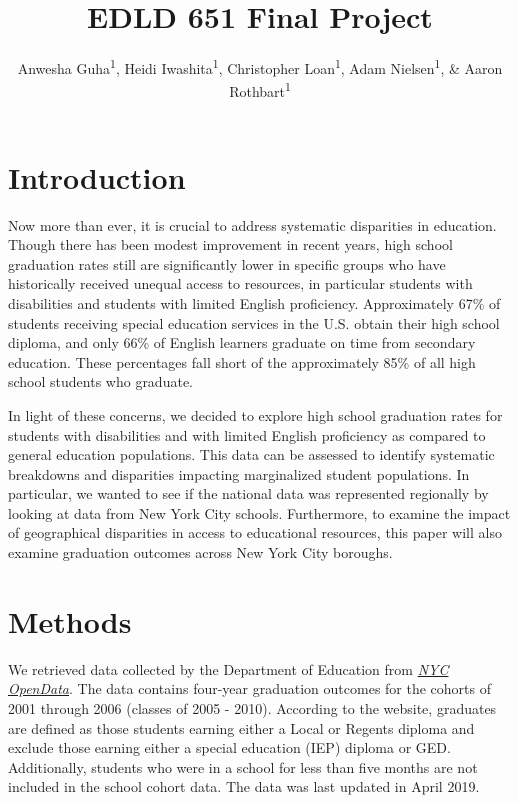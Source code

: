 \documentclass[
  english,
  man, fleqn, noextraspace]{apa6}
\title{EDLD 651 Final Project}
\author{Anwesha Guha\textsuperscript{1}, Heidi Iwashita\textsuperscript{1}, Christopher Loan\textsuperscript{1}, Adam Nielsen\textsuperscript{1}, \& Aaron Rothbart\textsuperscript{1}}
\date{}
\affiliation{\vspace{0.5cm}\textsuperscript{1} University of Oregon}
\begin{document}
\maketitle

\hypertarget{introduction}{%
\section{Introduction}\label{introduction}}

Now more than ever, it is crucial to address systematic disparities in education. Though there has been modest improvement in recent years, high school graduation rates still are significantly lower in specific groups who have historically received unequal access to resources, in particular students with disabilities and students with limited English proficiency. Approximately 67\% of students receiving special education services in the U.S. obtain their high school diploma, and only 66\% of English learners graduate on time from secondary education. These percentages fall short of the approximately 85\% of all high school students who graduate.

In light of these concerns, we decided to explore high school graduation rates for students with disabilities and with limited English proficiency as compared to general education populations. This data can be assessed to identify systematic breakdowns and disparities impacting marginalized student populations. In particular, we wanted to see if the national data was represented regionally by looking at data from New York City schools. Furthermore, to examine the impact of geographical disparities in access to educational resources, this paper will also examine graduation outcomes across New York City boroughs.

\hypertarget{methods}{%
\section{Methods}\label{methods}}

We retrieved data collected by the Department of Education from \href{https://data.cityofnewyork.us/Education/2005-2010-Graduation-Outcomes-By-Borough/avir-tzek}{\emph{NYC OpenData}}. The data contains four-year graduation outcomes for the cohorts of 2001 through 2006 (classes of 2005 - 2010). According to the website, graduates are defined as those students earning either a Local or Regents diploma and exclude those earning either a special education (IEP) diploma or GED. Additionally, students who were in a school for less than five months are not included in the school cohort data. The data was last updated in April 2019.
\end{document}
